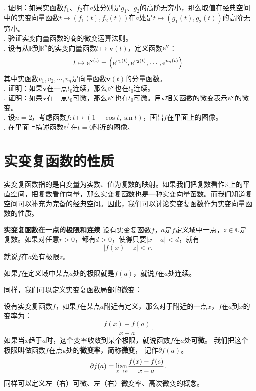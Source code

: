 \documentclass[12pt,UTF8,fontset=none]{ctexbook}
\begin{document}
\begin{xt}
    \mbox{} \\
    . 证明：如果实函数$f_1$、$f_2$在$a$处分别是$g_1$、$g_2$的高阶无穷小，那么取值在经典空间中的实变向量函数$t\mapsto (f_1(t), f_2(t))$在$a$处是$t\mapsto (g_1(t), g_2(t))$的高阶无穷小。\\
    . 验证实变向量函数的商的微变运算法则。\\
    . 设有从$\mathbb{R}$到$\mathbb{R}^n$的实变向量函数$t\mapsto \mathbf{v}(t)$，定义函数$\mathrm{e}^{\mathbf{v}}$：
    $$ t\mapsto \mathrm{e}^{\mathbf{v}(t)} = \left(\mathrm{e}^{v_1(t)}, \mathrm{e}^{v_2(t)}, \cdots , \mathrm{e}^{v_n(t)}\right)$$
    其中实函数$v_1, v_2, \cdots, v_n$是向量函数$\mathbf{v}(t)$的分量函数。\\
    . 证明：如果$\mathbf{v}$在一点$t_0$连续，那么$\mathrm{e}^{\mathbf{v}}$也在$t_0$连续。\\
    . 证明：如果$\mathbf{v}$在一点$t_0$可微，那么$\mathrm{e}^{\mathbf{v}}$也在$t_0$可微。用$\mathbf{v}$相关函数的微变表示$\mathrm{e}^{\mathbf{v}}$的微变。\\
    . 设$n=2$，考虑函数$f: t\mapsto (1 - \cos{t}, \sin{t})$，画出$f$在平面上的图像。\\
    . 在平面上描述函数$\mathrm{e}^f$在$t=0$附近的图像。
\end{xt}

\section{实变复函数的性质}

实变复函数指的是自变量为实数、值为复数的映射。如果我们把复数看作$\mathbb{R}$上的平直空间，把复数看作向量，那么实变复函数也是一种实变向量函数。而我们知道复空间可以补充为完备的经典空间。因此，我们可以讨论实变复函数作为实变向量函数的性质。

\begin{df}{\textbf{实变复函数在一点的极限和连续}}
    设有实变复函数$f$，$a$是$f$定义域中一点，$z\in\mathbb{C}$是复数。如果对任意$r>0$，都有$d>0$，使得只要$|x - a| < d$，就有
    $$|f(x) - z| < r.$$
    就说$f$在$a$处有极限$z$。

    如果$f$在定义域中某点$a$处的极限就是$f(a)$，就说$f$在$a$处连续。
\end{df}

同样，我们可以定义实变复函数局部的微变：
\begin{df}
    设有实变复函数$f$，如果$f$在某点$a$附近有定义，那么对于附近的一点$x$，$f$在$a$到$x$的变率为：
    $$ \frac{f(x) - f(a)}{x - a}.$$
    如果当$x$趋于$a$时，这个变率收敛到某个极限，就说函数$f$在$a$处\textbf{可微}。
    我们把这个极限叫做函数$f$在点$a$处的\textbf{微变率}，简称\textbf{微变}，
    记作$\partial f(a)$。
    $$ \partial f(a) = \underset{{x\to a}}{\operatorname{lian}\,} \frac{f(x) - f(a)}{x - a}. $$
    同样可以定义左（右）可微、左（右）微变率、高次微变的概念。
\end{df}
\end{document}
